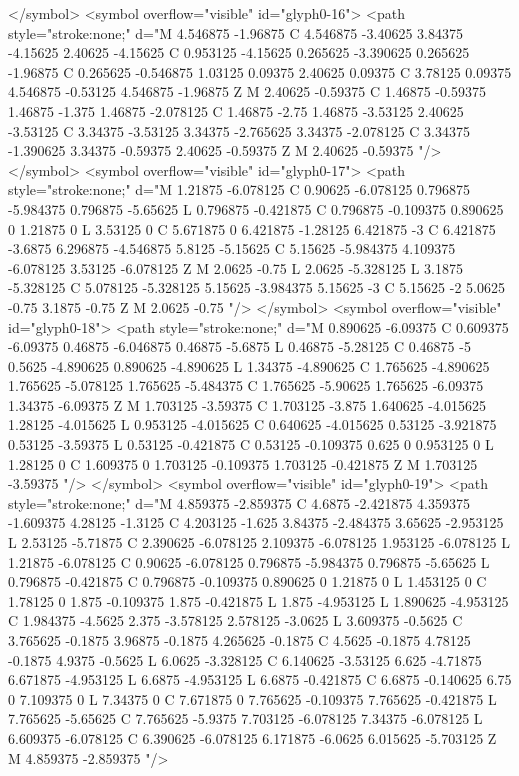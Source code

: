 </symbol>
<symbol overflow="visible" id="glyph0-16">
<path style="stroke:none;" d="M 4.546875 -1.96875 C 4.546875 -3.40625 3.84375 -4.15625 2.40625 -4.15625 C 0.953125 -4.15625 0.265625 -3.390625 0.265625 -1.96875 C 0.265625 -0.546875 1.03125 0.09375 2.40625 0.09375 C 3.78125 0.09375 4.546875 -0.53125 4.546875 -1.96875 Z M 2.40625 -0.59375 C 1.46875 -0.59375 1.46875 -1.375 1.46875 -2.078125 C 1.46875 -2.75 1.46875 -3.53125 2.40625 -3.53125 C 3.34375 -3.53125 3.34375 -2.765625 3.34375 -2.078125 C 3.34375 -1.390625 3.34375 -0.59375 2.40625 -0.59375 Z M 2.40625 -0.59375 "/>
</symbol>
<symbol overflow="visible" id="glyph0-17">
<path style="stroke:none;" d="M 1.21875 -6.078125 C 0.90625 -6.078125 0.796875 -5.984375 0.796875 -5.65625 L 0.796875 -0.421875 C 0.796875 -0.109375 0.890625 0 1.21875 0 L 3.53125 0 C 5.671875 0 6.421875 -1.28125 6.421875 -3 C 6.421875 -3.6875 6.296875 -4.546875 5.8125 -5.15625 C 5.15625 -5.984375 4.109375 -6.078125 3.53125 -6.078125 Z M 2.0625 -0.75 L 2.0625 -5.328125 L 3.1875 -5.328125 C 5.078125 -5.328125 5.15625 -3.984375 5.15625 -3 C 5.15625 -2 5.0625 -0.75 3.1875 -0.75 Z M 2.0625 -0.75 "/>
</symbol>
<symbol overflow="visible" id="glyph0-18">
<path style="stroke:none;" d="M 0.890625 -6.09375 C 0.609375 -6.09375 0.46875 -6.046875 0.46875 -5.6875 L 0.46875 -5.28125 C 0.46875 -5 0.5625 -4.890625 0.890625 -4.890625 L 1.34375 -4.890625 C 1.765625 -4.890625 1.765625 -5.078125 1.765625 -5.484375 C 1.765625 -5.90625 1.765625 -6.09375 1.34375 -6.09375 Z M 1.703125 -3.59375 C 1.703125 -3.875 1.640625 -4.015625 1.28125 -4.015625 L 0.953125 -4.015625 C 0.640625 -4.015625 0.53125 -3.921875 0.53125 -3.59375 L 0.53125 -0.421875 C 0.53125 -0.109375 0.625 0 0.953125 0 L 1.28125 0 C 1.609375 0 1.703125 -0.109375 1.703125 -0.421875 Z M 1.703125 -3.59375 "/>
</symbol>
<symbol overflow="visible" id="glyph0-19">
<path style="stroke:none;" d="M 4.859375 -2.859375 C 4.6875 -2.421875 4.359375 -1.609375 4.28125 -1.3125 C 4.203125 -1.625 3.84375 -2.484375 3.65625 -2.953125 L 2.53125 -5.71875 C 2.390625 -6.078125 2.109375 -6.078125 1.953125 -6.078125 L 1.21875 -6.078125 C 0.90625 -6.078125 0.796875 -5.984375 0.796875 -5.65625 L 0.796875 -0.421875 C 0.796875 -0.109375 0.890625 0 1.21875 0 L 1.453125 0 C 1.78125 0 1.875 -0.109375 1.875 -0.421875 L 1.875 -4.953125 L 1.890625 -4.953125 C 1.984375 -4.5625 2.375 -3.578125 2.578125 -3.0625 L 3.609375 -0.5625 C 3.765625 -0.1875 3.96875 -0.1875 4.265625 -0.1875 C 4.5625 -0.1875 4.78125 -0.1875 4.9375 -0.5625 L 6.0625 -3.328125 C 6.140625 -3.53125 6.625 -4.71875 6.671875 -4.953125 L 6.6875 -4.953125 L 6.6875 -0.421875 C 6.6875 -0.140625 6.75 0 7.109375 0 L 7.34375 0 C 7.671875 0 7.765625 -0.109375 7.765625 -0.421875 L 7.765625 -5.65625 C 7.765625 -5.9375 7.703125 -6.078125 7.34375 -6.078125 L 6.609375 -6.078125 C 6.390625 -6.078125 6.171875 -6.0625 6.015625 -5.703125 Z M 4.859375 -2.859375 "/>
